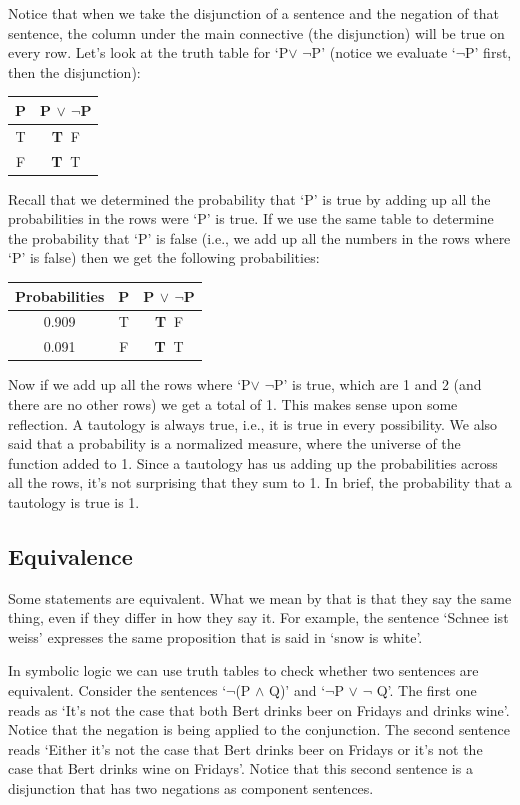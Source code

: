 \documentclass[]{tufte-book}
\begin{document}
Notice that when we take the disjunction of a sentence and the negation of that sentence, the column under the main connective (the disjunction) will be true on every row. Let's look at the truth table for `P\(\vee\) \(\neg\)P' (notice we evaluate `\(\neg\)P' first, then the disjunction):

\begin{longtable}[]{@{}cc@{}}
\toprule
P & P \(\vee\) \(\neg\)P\tabularnewline
\midrule
\endhead
T & \textbf{T\(~\)} F\tabularnewline
F & \textbf{T\(~\)} T\tabularnewline
\bottomrule
\end{longtable}

Recall that we determined the probability that `P' is true by adding up all the probabilities in the rows were `P' is true. If we use the same table to determine the probability that `P' is false (i.e., we add up all the numbers in the rows where `P' is false) then we get the following probabilities:

\begin{longtable}[]{@{}ccc@{}}
\toprule
Probabilities & P & P \(\vee\) \(\neg\)P\tabularnewline
\midrule
\endhead
0.909 & T & \textbf{T\(~\)} F\tabularnewline
0.091 & F & \textbf{T\(~\)} T\tabularnewline
\bottomrule
\end{longtable}

Now if we add up all the rows where `P\(\vee\) \(\neg\)P' is true, which are 1 and 2 (and there are no other rows) we get a total of 1. This makes sense upon some reflection. A tautology is always true, i.e., it is true in every possibility. We also said that a probability is a normalized measure, where the universe of the function added to 1. Since a tautology has us adding up the probabilities across all the rows, it's not surprising that they sum to 1. In brief, the probability that a tautology is true is 1.

\hypertarget{equivalence}{%
\subsection{Equivalence}\label{equivalence}}

Some statements are equivalent. What we mean by that is that they say the same thing, even if they differ in how they say it. For example, the sentence `Schnee ist weiss' expresses the same proposition that is said in `snow is white'.

In symbolic logic we can use truth tables to check whether two sentences are equivalent. Consider the sentences `\(\neg\)(P \(\wedge\) Q)' and `\(\neg\)P \(\vee\) \(\neg\) Q'. The first one reads as `It's not the case that both Bert drinks beer on Fridays and drinks wine'. Notice that the negation is being applied to the conjunction. The second sentence reads `Either it's not the case that Bert drinks beer on Fridays or it's not the case that Bert drinks wine on Fridays'. Notice that this second sentence is a disjunction that has two negations as component sentences.
\end{document}
